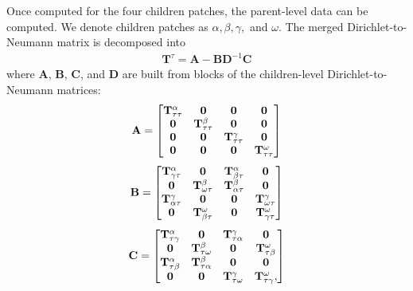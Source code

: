 Once computed for the four children patches, the parent-level data can be computed. We denote children patches as $\alpha, \beta, \gamma,$ and $\omega$. The merged Dirichlet-to-Neumann matrix is decomposed into
\begin{align}
    \textbf{T}^{\tau} = \textbf{A} - \textbf{B} \textbf{D}^{-1} \textbf{C}
    \label{eq:T-merged}
\end{align}
where $\textbf{A}$, $\textbf{B}$, $\textbf{C}$, and $\textbf{D}$ are built from blocks of the children-level Dirichlet-to-Neumann matrices:
\begin{align}
    \textbf{A} =
    \begin{bmatrix}
        \mathbf T^{\alpha}_{\tau\tau} & \mathbf 0 & \mathbf 0 & \mathbf 0 \\
        \mathbf 0 & \mathbf T^{\beta}_{\tau\tau} & \mathbf 0 & \mathbf 0  \\
        \mathbf 0 & \mathbf 0 & \mathbf T^{\gamma}_{\tau\tau} & \mathbf 0  \\
        \mathbf 0& \mathbf 0 & \mathbf 0 & \mathbf T^{\omega}_{\tau\tau} \\
    \end{bmatrix}
    \label{eq:matrix_A}
\end{align}
\begin{align}
    \textbf{B} = 
    \begin{bmatrix}
        \mathbf T^{\alpha}_{\gamma\tau} & \mathbf 0              & \mathbf T^{\alpha}_{\beta\tau} & \mathbf 0 \\
        \mathbf 0               & \mathbf T^{\beta}_{\omega\tau} & \mathbf T^{\beta}_{\alpha\tau} & \mathbf 0 \\
        \mathbf T^{\gamma}_{\alpha\tau} & \mathbf 0              & \mathbf 0              & \mathbf T^{\gamma}_{\omega\tau} \\
        \mathbf 0               & \mathbf T^{\omega}_{\beta\tau} & \mathbf 0              & \mathbf T^{\omega}_{\gamma\tau}
    \end{bmatrix}
    \label{eq:matrix_B}
\end{align}
\begin{align}
    \textbf{C} = 
    \begin{bmatrix}
        \mathbf T^{\alpha}_{\tau\gamma} & \mathbf 0               & \mathbf T^{\gamma}_{\tau\alpha} & \mathbf 0 \\
        \mathbf 0               & \mathbf T^{\beta}_{\tau\omega}  & \mathbf 0                & \mathbf T^{\omega}_{\tau\beta} \\ 
        \mathbf T^{\alpha}_{\tau\beta}  & \mathbf T^{\beta}_{\tau\alpha} & \mathbf 0                & \mathbf 0 \\
        \mathbf 0               & \mathbf 0               & \mathbf T^{\gamma}_{\tau\omega}  & \mathbf T^{\omega}_{\tau\gamma},
    \end{bmatrix}
    \label{eq:matrix_C}
\end{align}
